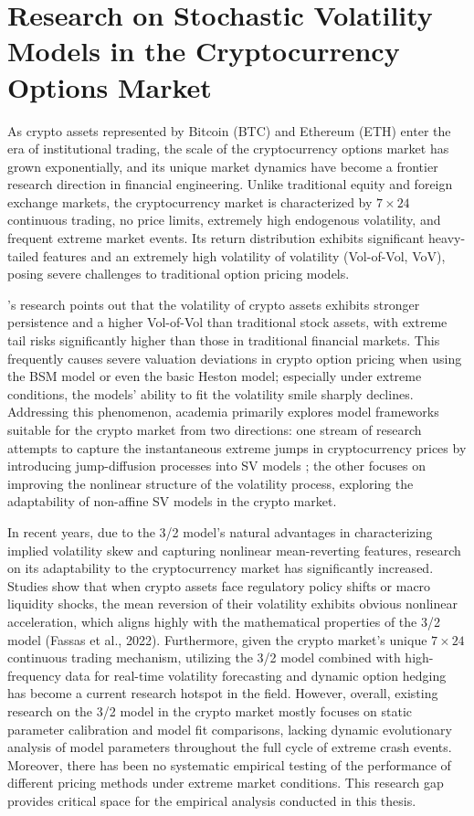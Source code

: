 \section{Research on Stochastic Volatility Models in the Cryptocurrency Options Market}

As crypto assets represented by Bitcoin (BTC) and Ethereum (ETH) enter the era of institutional trading, the scale of the cryptocurrency options market has grown exponentially, and its unique market dynamics have become a frontier research direction in financial engineering. Unlike traditional equity and foreign exchange markets, the cryptocurrency market is characterized by $7\times24$ continuous trading, no price limits, extremely high endogenous volatility, and frequent extreme market events. Its return distribution exhibits significant heavy-tailed features and an extremely high volatility of volatility (Vol-of-Vol, VoV), posing severe challenges to traditional option pricing models.

\citet{houPricingCryptocurrencyOptions2020}'s research points out that the volatility of crypto assets exhibits stronger persistence and a higher Vol-of-Vol than traditional stock assets, with extreme tail risks significantly higher than those in traditional financial markets. This frequently causes severe valuation deviations in crypto option pricing when using the BSM model or even the basic Heston model; especially under extreme conditions, the models' ability to fit the volatility smile sharply declines. Addressing this phenomenon, academia primarily explores model frameworks suitable for the crypto market from two directions: one stream of research attempts to capture the instantaneous extreme jumps in cryptocurrency prices by introducing jump-diffusion processes into SV models \citet{scaillet2020high}; the other focuses on improving the nonlinear structure of the volatility process, exploring the adaptability of non-affine SV models in the crypto market.

In recent years, due to the 3/2 model's natural advantages in characterizing implied volatility skew and capturing nonlinear mean-reverting features, research on its adaptability to the cryptocurrency market has significantly increased. Studies show that when crypto assets face regulatory policy shifts or macro liquidity shocks, the mean reversion of their volatility exhibits obvious nonlinear acceleration, which aligns highly with the mathematical properties of the 3/2 model (Fassas et al., 2022). Furthermore, given the crypto market's unique $7\times24$ continuous trading mechanism, utilizing the 3/2 model combined with high-frequency data for real-time volatility forecasting and dynamic option hedging has become a current research hotspot in the field. However, overall, existing research on the 3/2 model in the crypto market mostly focuses on static parameter calibration and model fit comparisons, lacking dynamic evolutionary analysis of model parameters throughout the full cycle of extreme crash events. Moreover, there has been no systematic empirical testing of the performance of different pricing methods under extreme market conditions. This research gap provides critical space for the empirical analysis conducted in this thesis.

